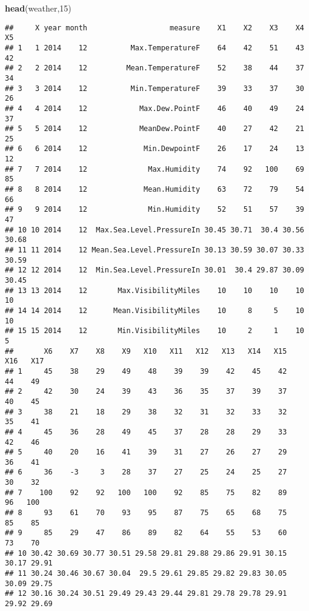 \documentclass[]{article}
\newenvironment{Shaded}{\begin{snugshade}}{\end{snugshade}}
\newcommand{\KeywordTok}[1]{\textcolor[rgb]{0.13,0.29,0.53}{\textbf{#1}}}
\newcommand{\DecValTok}[1]{\textcolor[rgb]{0.00,0.00,0.81}{#1}}
\newcommand{\NormalTok}[1]{#1}
\begin{document}
\begin{Shaded}
\begin{Highlighting}[]
\KeywordTok{head}\NormalTok{(weather,}\DecValTok{15}\NormalTok{)}
\end{Highlighting}
\end{Shaded}

\begin{verbatim}
##     X year month                   measure    X1    X2    X3    X4    X5
## 1   1 2014    12          Max.TemperatureF    64    42    51    43    42
## 2   2 2014    12         Mean.TemperatureF    52    38    44    37    34
## 3   3 2014    12          Min.TemperatureF    39    33    37    30    26
## 4   4 2014    12            Max.Dew.PointF    46    40    49    24    37
## 5   5 2014    12            MeanDew.PointF    40    27    42    21    25
## 6   6 2014    12             Min.DewpointF    26    17    24    13    12
## 7   7 2014    12              Max.Humidity    74    92   100    69    85
## 8   8 2014    12             Mean.Humidity    63    72    79    54    66
## 9   9 2014    12              Min.Humidity    52    51    57    39    47
## 10 10 2014    12  Max.Sea.Level.PressureIn 30.45 30.71  30.4 30.56 30.68
## 11 11 2014    12 Mean.Sea.Level.PressureIn 30.13 30.59 30.07 30.33 30.59
## 12 12 2014    12  Min.Sea.Level.PressureIn 30.01  30.4 29.87 30.09 30.45
## 13 13 2014    12       Max.VisibilityMiles    10    10    10    10    10
## 14 14 2014    12      Mean.VisibilityMiles    10     8     5    10    10
## 15 15 2014    12       Min.VisibilityMiles    10     2     1    10     5
##       X6    X7    X8    X9   X10   X11   X12   X13   X14   X15   X16   X17
## 1     45    38    29    49    48    39    39    42    45    42    44    49
## 2     42    30    24    39    43    36    35    37    39    37    40    45
## 3     38    21    18    29    38    32    31    32    33    32    35    41
## 4     45    36    28    49    45    37    28    28    29    33    42    46
## 5     40    20    16    41    39    31    27    26    27    29    36    41
## 6     36    -3     3    28    37    27    25    24    25    27    30    32
## 7    100    92    92   100   100    92    85    75    82    89    96   100
## 8     93    61    70    93    95    87    75    65    68    75    85    85
## 9     85    29    47    86    89    82    64    55    53    60    73    70
## 10 30.42 30.69 30.77 30.51 29.58 29.81 29.88 29.86 29.91 30.15 30.17 29.91
## 11 30.24 30.46 30.67 30.04  29.5 29.61 29.85 29.82 29.83 30.05 30.09 29.75
## 12 30.16 30.24 30.51 29.49 29.43 29.44 29.81 29.78 29.78 29.91 29.92 29.69

\end{verbatim}
\end{document}
